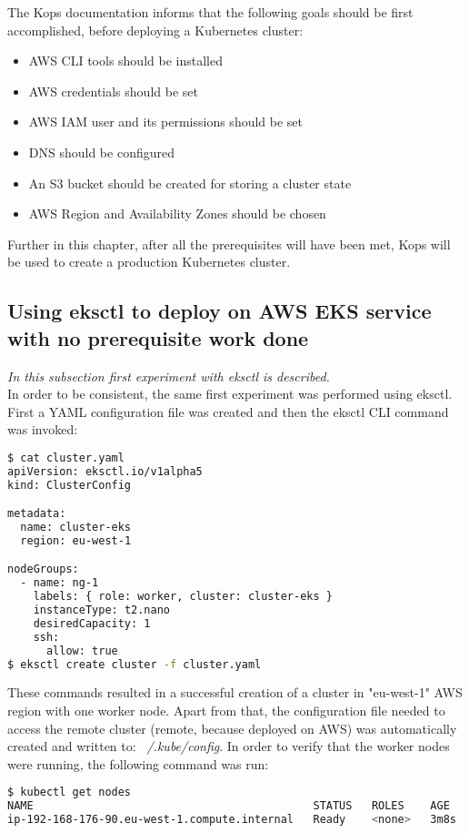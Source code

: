 The Kops documentation\cite{online-kops-aws} informs that the following goals should be first accomplished, before deploying a Kubernetes cluster:
\begin{itemize}
\item AWS CLI tools should be installed
\item AWS credentials should be set
\item AWS IAM user and its permissions should be set
\item DNS should be configured
\item An S3 bucket should be created for storing a cluster state
\item AWS Region and Availability Zones should be chosen
\end{itemize}

Further in this chapter, after all the prerequisites will have been met, Kops will be used to create a production Kubernetes cluster.

\subsection{Using eksctl to deploy on AWS EKS service with no prerequisite work done}
\textit{In this subsection first experiment with eksctl is described.}
\\

In order to be consistent, the same first experiment was performed using eksctl. First a YAML configuration file was created and then the eksctl CLI command was invoked:
\begin{lstlisting}[basicstyle=\small,caption={Commands used to create a cluster with eksctl, without prerequisite steps performed},captionpos=b,language=Bash,xleftmargin=1cm]
$ cat cluster.yaml
apiVersion: eksctl.io/v1alpha5
kind: ClusterConfig

metadata:
  name: cluster-eks
  region: eu-west-1

nodeGroups:
  - name: ng-1
    labels: { role: worker, cluster: cluster-eks }
    instanceType: t2.nano
    desiredCapacity: 1
    ssh:
      allow: true
$ eksctl create cluster -f cluster.yaml
\end{lstlisting}

These commands resulted in a successful creation of a cluster in "eu-west-1" AWS region with one worker node. Apart from that, the configuration file needed to access the remote cluster (remote, because deployed on AWS) was automatically created and written to: \textit{~/.kube/config}. In order to verify that the worker nodes were running, the following command was run:
\begin{lstlisting}[basicstyle=\small,caption={Command used to list Kubernetes worker nodes to verify that one such node was running},captionpos=b,language=Bash,xleftmargin=1cm]
$ kubectl get nodes
NAME                                           STATUS   ROLES    AGE    VERSION
ip-192-168-176-90.eu-west-1.compute.internal   Ready    <none>   3m8s   v1.16.8
\end{lstlisting}


